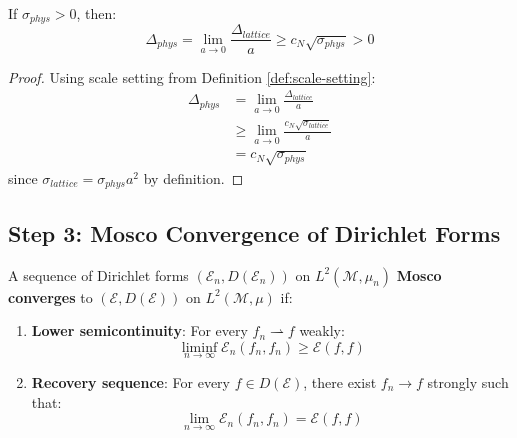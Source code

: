 \begin{corollary}
\label{cor:physical-gap-app114_roadmap_continuum_limit}
If $\sigma_{phys} > 0$, then:
\begin{equation}
\Delta_{phys} = \lim_{a \to 0} \frac{\Delta_{lattice}}{a} \geq c_N \sqrt{\sigma_{phys}} > 0
\end{equation}
\end{corollary}

\begin{proof}
Using scale setting from Definition \ref{def:scale-setting}:
\begin{align}
\Delta_{phys} &= \lim_{a \to 0} \frac{\Delta_{lattice}}{a} \\
&\geq \lim_{a \to 0} \frac{c_N \sqrt{\sigma_{lattice}}}{a} \\
&= c_N \sqrt{\sigma_{phys}}
\end{align}
since $\sigma_{lattice} = \sigma_{phys} a^2$ by definition.
\end{proof}

\subsection{Step 3: Mosco Convergence of Dirichlet Forms}

\begin{definition}
\label{def:mosco-app114_roadmap_continuum_limit}
A sequence of Dirichlet forms $(\mathcal{E}_n, D(\mathcal{E}_n))$ on 
$L^2(\mathcal{M}, \mu_n)$ \textbf{Mosco converges} to $(\mathcal{E}, D(\mathcal{E}))$ 
on $L^2(\mathcal{M}, \mu)$ if:
\begin{enumerate}
\item \textbf{Lower semicontinuity}: For every $f_n \rightharpoonup f$ weakly:
\begin{equation}
\liminf_{n \to \infty} \mathcal{E}_n(f_n, f_n) \geq \mathcal{E}(f, f)
\end{equation}

\item \textbf{Recovery sequence}: For every $f \in D(\mathcal{E})$, there exist 
$f_n \to f$ strongly such that:
\begin{equation}
\lim_{n \to \infty} \mathcal{E}_n(f_n, f_n) = \mathcal{E}(f, f)
\end{equation}
\end{enumerate}
\end{definition}

